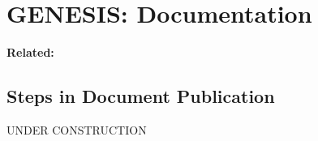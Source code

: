 \documentclass[12pt]{article}
\begin{document}
\section*{GENESIS: Documentation}

{\bf Related:}

\subsection*{Steps in Document Publication}


UNDER CONSTRUCTION
\end{document}
